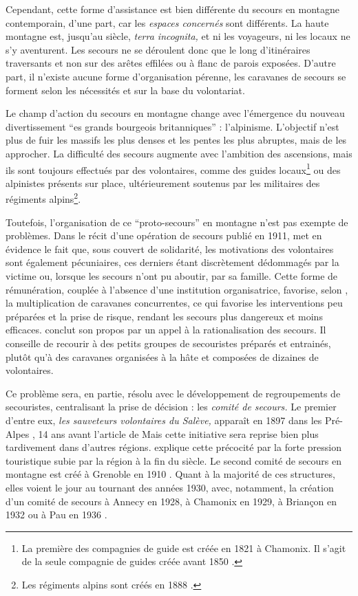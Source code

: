 Cependant, cette forme d'assistance est bien différente du secours en
montagne contemporain, d'une part, car les \emph{espaces concernés}
sont différents. La haute montagne est, jusqu'au 
siècle, \emph{terra incognita,} et ni les voyageurs, ni les locaux ne
s'y aventurent. Les secours ne se déroulent donc que le long
d'itinéraires traversants et non sur des arêtes effilées ou à flanc de
parois exposées. D'autre part, il n'existe aucune forme d'organisation
pérenne, les caravanes de secours se forment selon les nécessités et
sur la base du volontariat.

Le champ d'action du secours en montagne change avec l’émergence du
nouveau divertissement \enquote{es grands bourgeois
  britanniques} \autocite{Descamps2018} : l'alpinisme. L'objectif
n'est plus de fuir les massifs les plus denses et les pentes les plus
abruptes, mais de les approcher. La difficulté des secours augmente
avec l'ambition des ascensions, mais ils sont toujours effectués par
des volontaires, comme des guides locaux\footnote{La première des
  compagnies de guide est créée en 1821 à Chamonix. Il s'agit de la
  seule compagnie de guides créée avant 1850
  \autocite{ContributeursWikipedia2020b}.} ou des alpinistes présents
sur place, ultérieurement soutenus par les militaires des régiments
alpins\footnote{Les régiments alpins sont créés en 1888
  \autocite{Mezin2016}.}.

Toutefois, l'organisation de ce \enquote{proto-secours} en montagne
n'est pas exempte de problèmes. Dans le récit d'une opération de
secours publié en 1911, \textcite{Thomas1911} met en évidence le fait
que, sous couvert de solidarité, les motivations des volontaires sont
également pécuniaires, ces derniers étant discrètement dédommagés par
la victime ou, lorsque les secours n'ont pu aboutir, par sa
famille. Cette forme de rémunération, couplée à l'absence d'une
institution organisatrice, favorise, selon \textcite{Thomas1911}, la
multiplication de caravanes concurrentes, ce qui favorise les
interventions peu préparées et la prise de risque, rendant les secours
plus dangereux et moins efficaces. \textcite{Thomas1911} conclut son
propos par un appel à la rationalisation des secours. Il conseille de
recourir à des petits groupes de secouristes préparés et entrainés,
plutôt qu'à des caravanes organisées à la hâte et composées de
dizaines de volontaires.

Ce problème sera, en partie, résolu avec le développement de
regroupements de secouristes, centralisant la prise de décision : les
\emph{comité de secours.} Le premier d'entre eux, \emph{les sauveteurs
  volontaires du Salève,} apparaît en 1897 dans les Pré-Alpes
\autocite{CFDLD}, 14 ans avant l'article de  Mais cette
initiative sera reprise bien plus tardivement dans d'autres
régions. \textcite{Caille2016} explique cette précocité par la forte
pression touristique subie par la région à la fin du 
siècle.  Le second comité de secours en montagne est créé à Grenoble
en 1910 \autocite{CFDLD,Caille2016}. Quant à la majorité de ces
structures, elles voient le jour au tournant des années 1930, avec,
notamment, la création d'un comité de secours à Annecy en 1928, à
Chamonix en 1929, à Briançon en 1932 ou à Pau en 1936 \autocite{CFDLD,
  Devies1946}.

